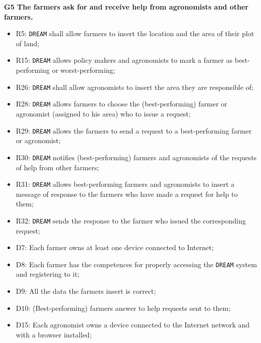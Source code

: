 \documentclass{article}
\begin{document}
\vspace{5mm}
\textbf{G5 The farmers ask for and receive help from agronomists and other farmers.}
\begin{itemize}
    \item R5: \verb|DREAM| shall allow farmers to insert the location and the area of their plot of land;
    
    \item R15: \verb|DREAM| allows policy makers and agronomists to mark a farmer as best-performing or worst-performing;
    
    \item R26: \verb|DREAM| shall allow agronomists to insert the area they are responsible of;
  
    \item R28: \verb|DREAM| allows farmers to choose the (best-performing) farmer or agronomist (assigned to his area) who to issue a request;
  
    \item R29: \verb|DREAM| allows the farmers to send a request to a best-performing farmer or agronomist;
    
    \item R30: \verb|DREAM| notifies (best-performing) farmers and agronomists of the requests of help from other farmers;

    \item R31: \verb|DREAM| allows best-performing farmers and agronomists to insert a message of response to the farmers who have made a request for help to them;

    \item R32: \verb|DREAM| sends the response to the farmer who issued the corresponding request;
    
    \item D7: Each farmer owns at least one device connected to Internet;
    
    \item D8: Each farmer has the competences for properly accessing the \verb|DREAM| system and registering to it;
    
    \item D9: All the data the farmers insert is correct;
    
    \item D10: (Best-performing) farmers answer to help requests sent to them;
    
    \item D15: Each agronomist owns a device connected to the Internet network and with a browser installed;


\end{itemize}
\end{document}
